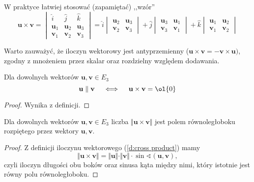 W praktyce łatwiej stosować (zapamiętać) ,,wzór''
\begin{equation} \label{eq:easy cross product}
    \mathbf{u} \times \mathbf{v} = \begin{vmatrix}
        \hat{i} & \hat{j} & \hat{k} \\
        \mathbf{u}_1 & \mathbf{u}_2 & \mathbf{u}_3 \\
        \mathbf{v}_1 & \mathbf{v}_2 & \mathbf{v}_3
    \end{vmatrix} = \hat{i}\begin{vmatrix}
        \mathbf{u}_2 & \mathbf{u}_3 \\
        \mathbf{v}_2 & \mathbf{v}_3
    \end{vmatrix} + \hat{j}\begin{vmatrix}
        \mathbf{u}_3 & \mathbf{u}_1 \\
        \mathbf{v}_3 & \mathbf{v}_1
    \end{vmatrix} + \hat{k}\begin{vmatrix}
        \mathbf{u}_1 & \mathbf{u}_2 \\
        \mathbf{v}_1 & \mathbf{v}_2
    \end{vmatrix}
\end{equation}

Warto zauważyć, że iloczyn wektorowy jest antyprzemienny ($\mathbf{u} \times \mathbf{v} = -\mathbf{v} \times \mathbf{u})$, zgodny z mnożeniem przez skalar oraz rozdzielny względem dodawania.

\begin{fact}
    Dla dowolnych wektorów $\mathbf{u}, \mathbf{v} \in E_3$
    \[ \mathbf{u} \parallel \mathbf{v} \quad \iff \quad \mathbf{u} \times \mathbf{v} = \ol{0} \]
\end{fact}
\begin{proof}
    Wynika z definicji.
\end{proof}

\begin{theorem}
    \label{t:area of parallelogram}
    Dla dowolnych wektorów $\mathbf{u}, \mathbf{v} \in E_3$ liczba $\Vert\mathbf{u}\times\mathbf{v}\Vert$ jest polem równoległoboku rozpiętego przez wektory $\mathbf{u}, \mathbf{v}$.
\end{theorem}
\begin{proof}
    Z definicji iloczynu wektorowego (\ref{d:cross product}) mamy
    \[ \Vert\mathbf{u}\times\mathbf{v}\Vert = \Vert\mathbf{u}\Vert\cdot\Vert\mathbf{v}\Vert\cdot\sin\sphericalangle(\mathbf{u}, \mathbf{v}), \]
    czyli iloczyn długości obu boków oraz sinusa kąta między nimi, który istotnie jest równy polu równoległoboku.
\end{proof}

